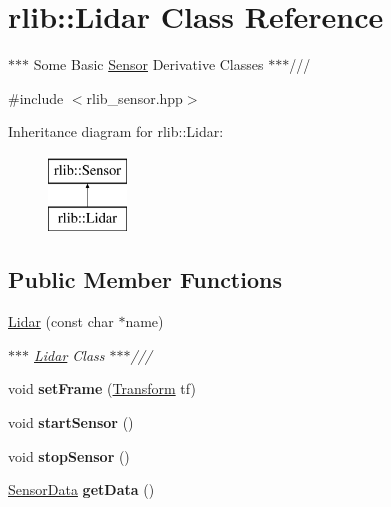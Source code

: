 \hypertarget{classrlib_1_1Lidar}{\section{rlib\-:\-:Lidar Class Reference}
\label{classrlib_1_1Lidar}
}


$\ast$$\ast$$\ast$ Some Basic \hyperlink{classrlib_1_1Sensor}{Sensor} Derivative Classes $\ast$$\ast$$\ast$///  




{\ttfamily \#include $<$rlib\-\_\-sensor.\-hpp$>$}

Inheritance diagram for rlib\-:\-:Lidar\-:\begin{figure}[H]
\begin{center}
\leavevmode
\includegraphics[height=2.000000cm]{classrlib_1_1Lidar}
\end{center}
\end{figure}
\subsection*{Public Member Functions}
\begin{DoxyCompactItemize}
\item 
\hypertarget{classrlib_1_1Lidar_abcf72f8479bf7869780a407d7f5eb636}{\hyperlink{classrlib_1_1Lidar_abcf72f8479bf7869780a407d7f5eb636}{Lidar} (const char $\ast$name)}\label{classrlib_1_1Lidar_abcf72f8479bf7869780a407d7f5eb636}

\begin{DoxyCompactList}\small\item\em $\ast$$\ast$$\ast$ \hyperlink{classrlib_1_1Lidar}{Lidar} Class $\ast$$\ast$$\ast$/// \end{DoxyCompactList}\item 
\hypertarget{classrlib_1_1Lidar_a61f34281376ee91d1f85ac6daae357b1}{void {\bfseries set\-Frame} (\hyperlink{classrlib_1_1Transform}{Transform} tf)}\label{classrlib_1_1Lidar_a61f34281376ee91d1f85ac6daae357b1}

\item 
\hypertarget{classrlib_1_1Lidar_adca8ff96e94bbb7490063c16ebf1c2e9}{void {\bfseries start\-Sensor} ()}\label{classrlib_1_1Lidar_adca8ff96e94bbb7490063c16ebf1c2e9}

\item 
\hypertarget{classrlib_1_1Lidar_aff59b61b1d295b8ac5fa6d7f5d3081c5}{void {\bfseries stop\-Sensor} ()}\label{classrlib_1_1Lidar_aff59b61b1d295b8ac5fa6d7f5d3081c5}

\item 
\hypertarget{classrlib_1_1Lidar_af1622c97196bab2330e9e4cfe42d1c51}{\hyperlink{classrlib_1_1SensorData}{Sensor\-Data} {\bfseries get\-Data} ()}\label{classrlib_1_1Lidar_af1622c97196bab2330e9e4cfe42d1c51}

\end{DoxyCompactItemize}


